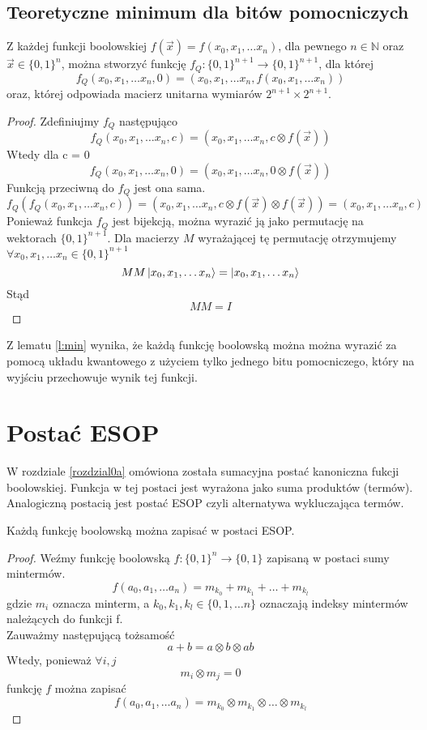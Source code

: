 \subsection{Teoretyczne minimum dla bitów pomocniczych}
\begin{lemma}
    \label{l:min}
    Z każdej funkcji boolowskiej $f(\vec{x}) = f(x_0, x_1, \ldots x_n)$, dla pewnego $n \in \mathbb{N}$ oraz $\vec{x} \in \{0, 1\}^n$, można stworzyć funkcję $f_Q : \{0, 1\}^{n+1}\rightarrow \{0, 1\}^{n+1}$, dla której 
    \[f_Q(x_0, x_1, \ldots x_n, 0) = (x_0, x_1, \ldots x_n, f(x_0, x_1, \ldots x_n))\] 
    oraz, której odpowiada macierz unitarna wymiarów $2^{n+1} \times 2^{n+1}$.
\end{lemma}
\begin{proof}
    Zdefiniujmy $f_Q$ następująco
    \[f_Q(x_0, x_1, \ldots x_n, c) = (x_0, x_1, \ldots x_n, c \otimes f(\vec{x}))\]
    Wtedy dla c = 0
    \[f_Q(x_0, x_1, \ldots x_n, 0) = (x_0, x_1, \ldots x_n, 0 \otimes f(\vec{x}))\]
    Funkcją przeciwną do $f_Q$ jest ona sama.
    \[f_Q(f_Q(x_0, x_1, \ldots x_n, c)) = (x_0, x_1, \ldots x_n, c \otimes f(\vec{x}) \otimes f(\vec{x})) = (x_0, x_1, \ldots x_n, c)\]
    Ponieważ funkcja $f_Q$ jest bijekcją, można wyrazić ją jako permutację na wektorach $\{0,1\}^{n+1}$. Dla macierzy $M$ wyrażającej tę permutację otrzymujemy $\forall x_0, x_1, \ldots x_n \in \{0,1\}^{n+1}$
    \[MM\ket{x_0, x_1, \ldots x_n} = \ket{x_0, x_1, \ldots x_n}\]
    Stąd
    \[MM = I\]
\end{proof}
Z lematu \ref{l:min} wynika, że każdą funkcję boolowską można można wyrazić za pomocą układu kwantowego z użyciem tylko jednego bitu pomocniczego, który na wyjściu przechowuje wynik tej funkcji.
\section{Postać ESOP}
W rozdziale \ref{rozdzial0a} omówiona została sumacyjna postać kanoniczna fukcji boolowskiej. Funkcja w tej postaci jest wyrażona jako suma produktów (termów). Analogiczną postacią jest postać ESOP czyli alternatywa wykluczająca termów.
\begin{theorem}
    Każdą funkcję boolowską można zapisać w postaci ESOP.
\end{theorem}
\begin{proof}
    Weźmy funkcję boolowską $f: \{0, 1\}^n \rightarrow \{0, 1\}$ zapisaną w postaci sumy mintermów.
    \[f(a_0, a_1, \ldots a_n) = m_{k_0} + m_{k_1} + \ldots + m_{k_l}\]
    gdzie $m_i$ oznacza minterm, a $k_0, k_1, k_l \in \{0, 1, \ldots n\}$ oznaczają indeksy mintermów należących do funkcji f.\\
    Zauważmy następującą tożsamość
    \[a + b = a \otimes b \otimes ab\]
    Wtedy, ponieważ $\forall i,j$
    \[m_i \otimes m_j = 0\]
    funkcję $f$ można zapisać
    \[f(a_0, a_1, \ldots a_n) = m_{k_0} \otimes m_{k_1} \otimes \ldots \otimes m_{k_l}\]
\end{proof}
